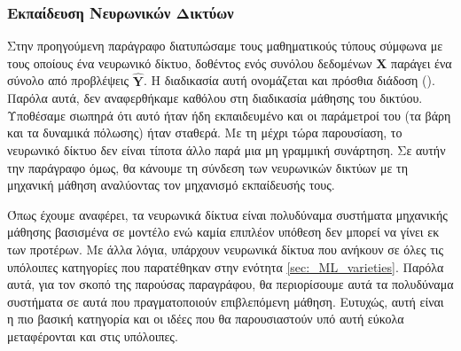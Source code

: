 \subsubsection{Εκπαίδευση Νευρωνικών Δικτύων}

Στην προηγούμενη παράγραφο διατυπώσαμε τους μαθηματικούς τύπους σύμφωνα με τους οποίους ένα νευρωνικό δίκτυο, δοθέντος ενός συνόλου δεδομένων $\boldsymbol{X}$ παράγει ένα σύνολο από προβλέψεις $\boldsymbol{\hat{Y}}$. Η διαδικασία αυτή ονομάζεται και πρόσθια διάδοση (). Παρόλα αυτά, δεν αναφερθήκαμε καθόλου στη διαδικασία μάθησης του δικτύου. Υποθέσαμε σιωπηρά ότι αυτό ήταν ήδη εκπαιδευμένο και οι παράμετροί του (τα βάρη και τα δυναμικά πόλωσης) ήταν σταθερά. Με τη μέχρι τώρα παρουσίαση, το νευρωνικό δίκτυο δεν είναι τίποτα άλλο παρά μια μη γραμμική συνάρτηση. Σε αυτήν την παράγραφο όμως, θα κάνουμε τη σύνδεση των νευρωνικών δικτύων με τη μηχανική μάθηση αναλύοντας τον μηχανισμό εκπαίδευσής τους. \par

Όπως έχουμε αναφέρει, τα νευρωνικά δίκτυα είναι πολυδύναμα συστήματα μηχανικής μάθησης βασισμένα σε μοντέλο ενώ καμία επιπλέον υπόθεση δεν μπορεί να γίνει εκ των προτέρων. Με άλλα λόγια, υπάρχουν νευρωνικά δίκτυα που ανήκουν σε όλες τις υπόλοιπες κατηγορίες που παρατέθηκαν στην ενότητα \ref{sec:_ML_varieties}. Παρόλα αυτά, για τον σκοπό της παρούσας παραγράφου, θα περιορίσουμε αυτά τα πολυδύναμα συστήματα σε αυτά που πραγματοποιούν επιβλεπόμενη μάθηση. Ευτυχώς, αυτή είναι η πιο βασική κατηγορία και οι ιδέες που θα παρουσιαστούν υπό αυτή εύκολα μεταφέρονται και στις υπόλοιπες. \par

